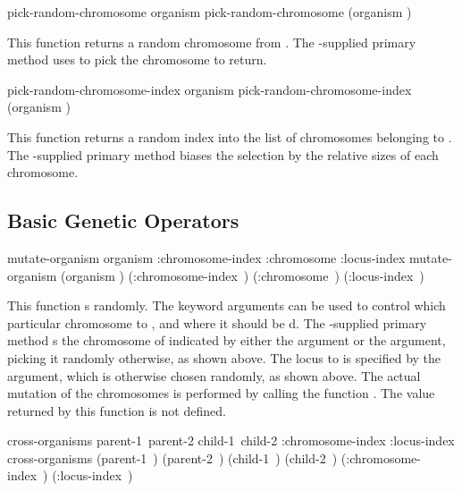 {\filbreak
{\samepage
\Defgeneric pick-random-chromosome {organism}
 pick-random-chromosome {(organism )}

This function returns a random chromosome from . The \geco-supplied
primary method uses  to pick the chromosome
to return.
\par}%

\filbreak
{\samepage
\Defgeneric pick-random-chromosome-index {organism}
 pick-random-chromosome-index {(organism )}

This function returns a random index into the list of chromosomes belonging to
. The \geco-supplied primary method biases the selection by the
relative sizes of each chromosome.
\par}%

\filbreak
{\samepage
\subsection{Basic Genetic Operators}

\Defgeneric mutate-organism {organism \key :chromosome-index :chromosome :locus-index}
 mutate-organism {(organism ) \key
    \hbox{(:chromosome-index )}
    \hbox{(:chromosome )}
    \hbox{(:locus-index )}}

This function s  randomly. The keyword arguments
can be used to control which particular chromosome to , and where it should be
d. The \geco-supplied primary method s the chromosome of 
indicated by either the  argument or the 
argument, picking it randomly otherwise, as shown above. The locus to  is
specified by the  argument, which is otherwise chosen randomly, as
shown above. The actual mutation of the chromosomes is performed by calling the
function .
The value returned by this function is not defined.
\par}%

\filbreak
{\samepage 
\Defgeneric cross-organisms {\hbox{parent-1 parent-2} \hbox{child-1 child-2}
                             \key :chromosome-index :locus-index}
 cross-organisms {\hbox{(parent-1 )} \hbox{(parent-2 )}
                            \hbox{(child-1 )} \hbox{(child-2 )}
    \key
    \hbox{(:chromosome-index )}
    \hbox{(:locus-index )}}

}}
